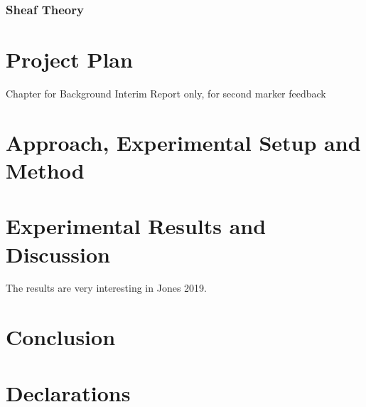 \documentclass[12pt,twoside]{report}
\begin{document}
\subsection{Sheaf Theory}


\chapter{Project Plan}
Chapter for Background Interim Report only, for second marker feedback




\chapter{Approach, 
Experimental Setup and Method}


\chapter{Experimental Results and Discussion}
The results are very interesting in Jones 2019.

\chapter{Conclusion}





\chapter*{Declarations}
\end{document}
